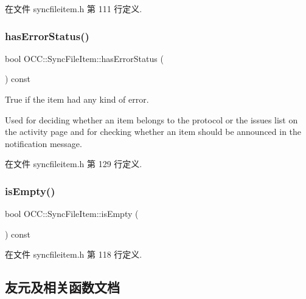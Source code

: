 在文件 syncfileitem.\+h 第 111 行定义.

\mbox{\label{class_o_c_c_1_1_sync_file_item_a9605a8ff213a000a039122801575ea33}} 
\subsubsection{\texorpdfstring{has\+Error\+Status()}{hasErrorStatus()}}
{\footnotesize\ttfamily bool O\+C\+C\+::\+Sync\+File\+Item\+::has\+Error\+Status (\begin{DoxyParamCaption}{ }\end{DoxyParamCaption}) const}

True if the item had any kind of error.

Used for deciding whether an item belongs to the protocol or the issues list on the activity page and for checking whether an item should be announced in the notification message. 

在文件 syncfileitem.\+h 第 129 行定义.

\mbox{\label{class_o_c_c_1_1_sync_file_item_a50e53014c5068af9e613649cf5e08f5e}} 
\subsubsection{\texorpdfstring{is\+Empty()}{isEmpty()}}
{\footnotesize\ttfamily bool O\+C\+C\+::\+Sync\+File\+Item\+::is\+Empty (\begin{DoxyParamCaption}{ }\end{DoxyParamCaption}) const}



在文件 syncfileitem.\+h 第 118 行定义.



\subsection{友元及相关函数文档}
\mbox{\label{class_o_c_c_1_1_sync_file_item_a5604437c536b0d80a805371dd6560739}} 
